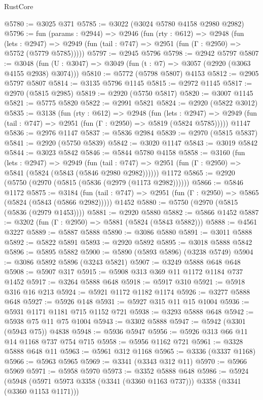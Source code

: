 \begin{lexlean}{RustCore}
\begin{coremodule}
@5780 := @3025 @371
@5785 := @3022 (@3024 @5780 @4158 @2980 @2982)
@5796 := fun (params : @2944) =>
  @2946
    (fun (rty : @612) =>
    @2948
      (fun (lets : @2947) =>
      @2949 (fun (tail : @747) => @2951 (fun (Γ : @2950) => @5752 (@5779 @5785)))))
@5797 := @2945 @5796
@5798 := @2942 @5797
@5807 := @3048 (fun (U : @3047) => @3049 (fun (t : @7) => @3057 (@2920 (@3063 @4155 @2938) @3074)))
@5810 := @5772 (@5798 @5807) @4153
@5812 := @2905 @5797 @5807
@5814 := @3135 @5796 @1145
@5815 := @2972 @1145
@5817 := @2970 (@5815 @2985)
@5819 := @2920 (@5750 @5817)
@5820 := @3007 @1145
@5821 := @5775 @5820
@5822 := @2991 @5821
@5824 := @2920 (@5822 @3012)
@5835 := @3138
    (fun (rty : @612) =>
    @2948
      (fun (lets : @2947) =>
      @2949 (fun (tail : @747) => @2951 (fun (Γ : @2950) => @5819 (@5824 @5785)))))
    @1147
@5836 := @2976 @1147
@5837 := @5836 @2984
@5839 := @2970 (@5815 @5837)
@5841 := @2920 (@5750 @5839)
@5842 := @3020 @1147
@5843 := @3019 @5842
@5844 := @3023 @5842
@5846 := @5844 @5780 @4158
@5858 := @3160
    (fun (lets : @2947) =>
    @2949
      (fun (tail : @747) => @2951 (fun (Γ : @2950) => @5841 (@5824 (@5843 (@5846 @2980 @2982))))))
    @1172
@5865 := @2920 (@5750 (@2970 (@5815 (@5836 (@2979 (@1173 @2982))))))
@5866 := @5846 @1172
@5875 := @3184
    (fun (tail : @747) => @2951 (fun (Γ : @2950) => @5865 (@5824 (@5843 (@5866 @2982)))))
    @1452
@5880 := @5750 (@2970 (@5815 (@5836 (@2979 @1453))))
@5881 := @2920 @5880
@5882 := @5866 @1452
@5887 := @3202 (fun (Γ : @2950) => @5881 (@5824 (@5843 @5882)))
@5888 := @4561 @3227
@5889 := @5887 @5888
@5890 := @3086 @5880
@5891 := @3011 @5888
@5892 := @5822 @5891
@5893 := @2920 @5892
@5895 := @3018 @5888 @5842
@5896 := @5895 @5882
@5900 := @5890 (@5893 @5896) (@3238 @5749)
@5904 := @3086 @5892 @5896 (@3243 @5821)
@5907 := @3249 @5888 @648 @648
@5908 := @5907 @317
@5915 := @5908 @313 @369 @11 @1172 @1184 @737 @1452
@5917 := @3264 @5888 @648
@5918 := @5917 @310
@5921 := @5918 @316 @16 @213
@5924 := @5921 @1172 @1182 @1174
@5926 := @3277 @5888 @648
@5927 := @5926 @148
@5931 := @5927 @315 @11 @15 @1004
@5936 := @5931 @1171 @1181 @715 @1152 @721
@5938 := @3293 @5888 @648
@5942 := @5938 @75 @11 @75 @1004
@5943 := @3302 @5888
@5947 := @5942 (@3301 (@5943 @75)) @4838
@5948 := @5936 @5947
@5956 := @5926 @313 @66 @11 @14 @1168 @737 @754 @715
@5958 := @5956 @1162 @721
@5961 := @3328 @5888 @648 @11
@5963 := @5961 @312 @1168
@5965 := @3336 (@3337 @1168)
@5966 := @5963 @5965
@5969 := @3341 (@3343 @312 @11)
@5970 := @5966 @5969
@5971 := @5958 @5970
@5973 := @3352 @5888 @648
@5986 := @5924
    (@5948 (@5971 @5973 @3358 (@3341 (@3360 @1163 @737))) @3358 (@3341 (@3360 @1153 @1171)))

\end{coremodule}
\end{lexlean}
